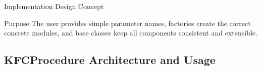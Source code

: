 \begin{frame}[fragile,t]{Implementation Design Concept}
{
    }

    \vspace{0.25cm}

    \begin{block}{Purpose}
        The user provides simple parameter names, factories create the correct concrete modules, and base classes keep all components consistent and extensible.
    \end{block}

\end{frame}

\subsection{KFCProcedure Architecture and Usage}

